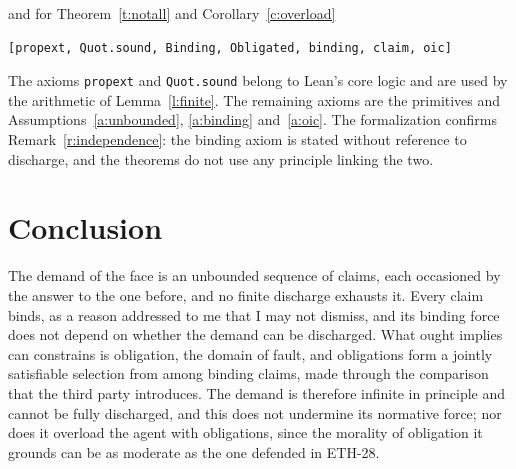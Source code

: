 \documentclass{situationist-preprint}
\begin{document}
\noindent and for Theorem~\ref{t:notall} and Corollary~\ref{c:overload}

\begin{lstlisting}
[propext, Quot.sound, Binding, Obligated, binding, claim, oic]
\end{lstlisting}

\noindent The axioms \texttt{propext} and \texttt{Quot.sound} belong to Lean's core logic and are used by the arithmetic of Lemma~\ref{l:finite}. The remaining axioms are the primitives and Assumptions~\ref{a:unbounded}, \ref{a:binding} and~\ref{a:oic}. The formalization confirms Remark~\ref{r:independence}: the binding axiom is stated without reference to discharge, and the theorems do not use any principle linking the two.

\section{Conclusion}

The demand of the face is an unbounded sequence of claims, each occasioned by the answer to the one before, and no finite discharge exhausts it. Every claim binds, as a reason addressed to me that I may not dismiss, and its binding force does not depend on whether the demand can be discharged. What ought implies can constrains is obligation, the domain of fault, and obligations form a jointly satisfiable selection from among binding claims, made through the comparison that the third party introduces. The demand is therefore infinite in principle and cannot be fully discharged, and this does not undermine its normative force; nor does it overload the agent with obligations, since the morality of obligation it grounds can be as moderate as the one defended in ETH-28.
\end{document}
